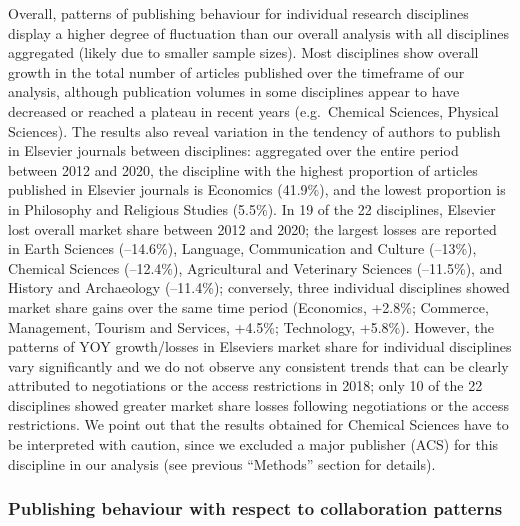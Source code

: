 \documentclass[
]{article}
\begin{document}
Overall, patterns of publishing behaviour for individual research disciplines display a higher degree of fluctuation than our overall analysis with all disciplines aggregated (likely due to smaller sample sizes). Most disciplines show overall growth in the total number of articles published over the timeframe of our analysis, although publication volumes in some disciplines appear to have decreased or reached a plateau in recent years (e.g.~Chemical Sciences, Physical Sciences). The results also reveal variation in the tendency of authors to publish in Elsevier journals between disciplines: aggregated over the entire period between 2012 and 2020, the discipline with the highest proportion of articles published in Elsevier journals is Economics (41.9\%), and the lowest proportion is in Philosophy and Religious Studies (5.5\%). In 19 of the 22 disciplines, Elsevier lost overall market share between 2012 and 2020; the largest losses are reported in Earth Sciences (--14.6\%), Language, Communication and Culture (--13\%), Chemical Sciences (--12.4\%), Agricultural and Veterinary Sciences (--11.5\%), and History and Archaeology (--11.4\%); conversely, three individual disciplines showed market share gains over the same time period (Economics, +2.8\%; Commerce, Management, Tourism and Services, +4.5\%; Technology, +5.8\%). However, the patterns of YOY growth/losses in Elsevier\textquotesingle s market share for individual disciplines vary significantly and we do not observe any consistent trends that can be clearly attributed to negotiations or the access restrictions in 2018; only 10 of the 22 disciplines showed greater market share losses following negotiations or the access restrictions. We point out that the results obtained for Chemical Sciences have to be interpreted with caution, since we excluded a major publisher (ACS) for this discipline in our analysis (see previous ``Methods'' section for details).

\hypertarget{publishing-behaviour-with-respect-to-collaboration-patterns}{%
\subsubsection{Publishing behaviour with respect to collaboration patterns}\label{publishing-behaviour-with-respect-to-collaboration-patterns}}
\end{document}
